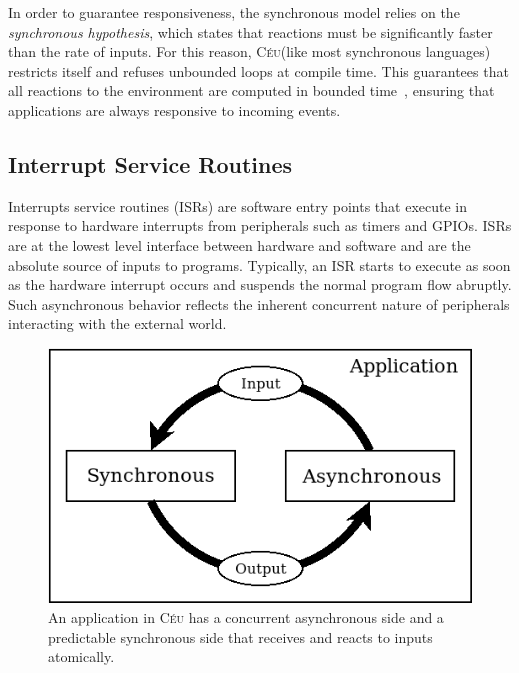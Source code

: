 \documentclass[sigplan,10pt,review,anonymous]{acmart}\settopmatter{printfolios=true,printccs=false,printacmref=false}
\newcommand{\CEU}{\textsc{C\'{e}u}\xspace}
\begin{document}
In order to guarantee responsiveness, the synchronous model relies on the
\emph{synchronous hypothesis}, which states that reactions must be
significantly faster than the rate of inputs.
%
For this reason, \CEU (like most synchronous languages) restricts itself and
refuses unbounded loops at compile time.
This guarantees that all reactions to the environment are computed in bounded
time~\cite{ceu.lctes18}, ensuring that applications are always responsive to
incoming events.

\subsection{Interrupt Service Routines}
\label{sec.isrs}

Interrupts service routines (ISRs) are software entry points that execute in
response to hardware interrupts from peripherals such as timers and GPIOs.
ISRs are at the lowest level interface between hardware and software and are
the absolute source of inputs to programs.
%
Typically, an ISR starts to execute as soon as the hardware interrupt occurs
and suspends the normal program flow abruptly.
Such asynchronous behavior reflects the inherent concurrent nature of
peripherals interacting with the external world.

\begin{figure}
\centering
\includegraphics[width=\linewidth]{sync-async}
\caption{ An application in \CEU has a concurrent asynchronous side and a
          predictable synchronous side that receives and reacts to inputs
          atomically.
\label{fig.async}
}
\end{figure}
\end{document}
